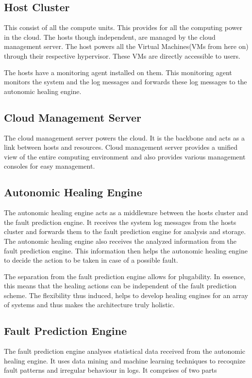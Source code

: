 \subsection{Host Cluster}
This consist of all the compute units. This provides for all the computing power in the cloud. The hosts though independent, are managed by the cloud management server. The host powers all the Virtual Machines(VMs from here on) through their respective hypervisor. These VMs are directly accessible to users.

The hosts have a monitoring agent installed on them. This monitoring agent monitors the system and the log messages and forwards these log messages to the autonomic healing engine.
\subsection{Cloud Management Server}
The cloud management server powers the cloud. It is the backbone and acts as a link between hosts and resources. Cloud management server provides a unified view of the entire computing environment and also provides various management consoles for easy management.
\subsection{Autonomic Healing Engine}
The autonomic healing engine acts as a middleware between the hosts cluster and the fault prediction engine. It receives the system log messages from the hosts cluster and forwards them to the fault prediction engine for analysis and storage. The autonomic healing engine also receives the analyzed information from the fault prediction engine. This information then helps the autonomic healing engine to decide the action to be taken in case of a possible fault.

The separation from the fault prediction engine allows for plugability. In essence, this means that the healing actions can be independent of the fault prediction scheme. The flexibility thus induced, helps to develop healing engines for an array of systems and thus makes the architecture truly holistic.
\subsection{Fault Prediction Engine}
The fault prediction engine analyses statistical data received from the autonomic healing engine. It uses data mining and machine learning techniques to recoqnize fault patterns and irregular behaviour in logs. It comprises of two parts

